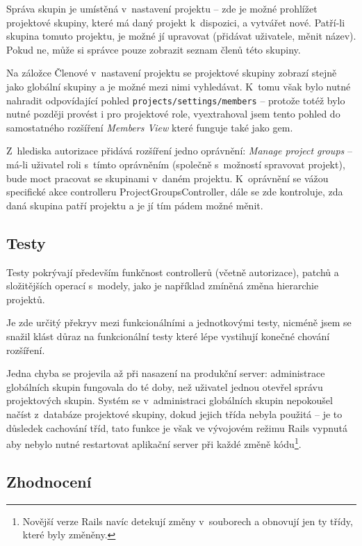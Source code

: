 \documentclass[thesis=B,czech]{FITthesis}[2012/05/02]
\begin{document}
Správa skupin je umístěná v~nastavení projektu -- zde je možné prohlížet
projektové skupiny, které má daný projekt k~dispozici, a vytvářet nové.
Patří-li skupina tomuto projektu, je možné jí upravovat (přidávat
uživatele, měnit název). Pokud ne, může si správce pouze zobrazit seznam
členů této skupiny.

Na záložce Členové v~nastavení projektu se projektové skupiny zobrazí
stejně jako globální skupiny a je možné mezi nimi vyhledávat. K~tomu
však bylo nutné nahradit odpovídající pohled
\lstinline!projects/settings/members! -- protože totéž bylo nutné
později provést i pro projektové role, vyextrahoval jsem tento pohled do
samostatného rozšíření \emph{Members View}
které funguje také jako \gls{gem}.

Z~hlediska autorizace přidává rozšíření jedno oprávnění: \emph{Manage
project groups} -- má-li uživatel roli s~tímto oprávněním (společně
s~možností spravovat projekt), bude moct pracovat se skupinami v~daném
projektu. K~oprávnění se vážou specifické akce controlleru
ProjectGroupsController, dále se zde kontroluje, zda daná skupina patří
projektu a je jí tím pádem možné měnit.

\subsection{Testy}

Testy pokrývají především funkčnost controllerů (včetně autorizace),
patchů a složitějších operací s~modely, jako je například zmíněná změna
hierarchie projektů.

Je zde určitý překryv mezi funkcionálními a jednotkovými testy, nicméně
jsem se snažil klást důraz na funkcionální testy které lépe vystihují
konečné chování rozšíření.

Jedna chyba se projevila až při nasazení na produkční server:
administrace globálních skupin fungovala do té doby, než uživatel jednou
otevřel správu projektových skupin. Systém se v~administraci globálních
skupin nepokoušel načíst z~databáze projektové skupiny, dokud jejich
třída nebyla použitá -- je to důsledek cachování tříd, tato funkce je
však ve vývojovém režimu Rails vypnutá aby nebylo nutné restartovat
aplikační server při každé změně kódu\footnote{Novější verze Rails navíc
  detekují změny v~souborech a obnovují jen ty třídy, které byly
  změněny.}.

\subsection{Zhodnocení}
\end{document}
